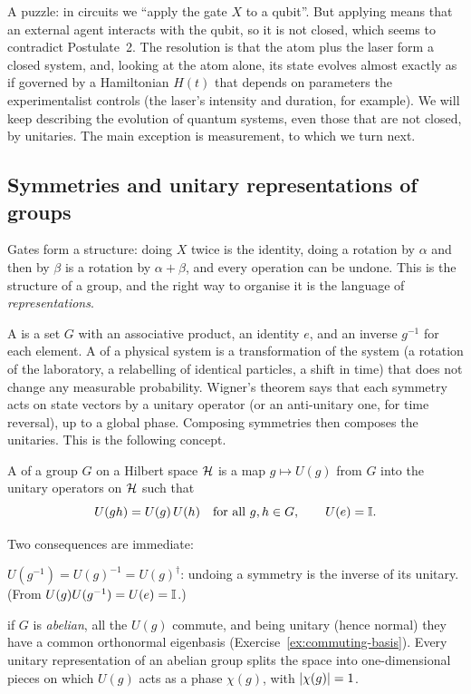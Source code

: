 \begin{remark}
  A puzzle: in circuits we ``apply the gate $X$ to a qubit''. But applying means that an external agent interacts with the qubit, so it is not closed, which seems to contradict Postulate~2. The resolution is that the atom plus the laser form a closed system, and, looking at the atom alone, its state evolves almost exactly as if governed by a Hamiltonian $H(t)$ that depends on parameters the experimentalist controls
  (the laser's intensity and duration, for example). We will keep describing the evolution of quantum systems, even those that are not closed, by unitaries. The main exception is measurement, to which we turn next.
\end{remark}

\subsection{Symmetries and unitary representations of groups}\label{sec:grouprep}

Gates form a structure: doing $X$ twice is the identity, doing a rotation by $\alpha$ and then by $\beta$ is a rotation by $\alpha+\beta$, and every operation can be undone. This is the structure of a group, and the right way to organise it is the language of \emph{representations}.

A  is a set $G$ with an associative product, an identity $e$, and an inverse $g^{-1}$ for each element. A  of a physical system is a transformation of the system (a rotation of the laboratory, a relabelling of identical particles, a shift in time) that does not change any measurable probability.
Wigner's theorem says that each symmetry acts on state vectors by a unitary operator (or an anti-unitary one, for time reversal), up to a global phase. Composing symmetries then composes the unitaries. This is the following concept.

\begin{definition}\label{def:unitaryrep}
  A  of a group $G$ on a Hilbert space $\mathcal{H}$ is a map $g\mapsto U(g)$ from $G$ into the unitary operators on $\mathcal{H}$ such that
  \[
    U(gh)=U(g)\,U(h)\quad\text{for all }g,h\in G,\qquad U(e)=\mathbb{I} .
  \]
\end{definition}

Two consequences are immediate:
\begin{steps}
  \item $U(g^{-1})=U(g)^{-1}=U(g)^\dagger$: undoing a symmetry is the inverse of its unitary. (From $U(g)U(g^{-1})=U(e)=\mathbb{I}$.)
  \item if $G$ is \emph{abelian}, all the $U(g)$ commute, and being unitary (hence normal) they have a common orthonormal eigenbasis (Exercise~\ref{ex:commuting-basis}). Every unitary representation of an abelian group splits the space into one-dimensional pieces on which $U(g)$ acts as a phase $\chi(g)$, with $\left|\chi(g)\right|=1$.
\end{steps}

